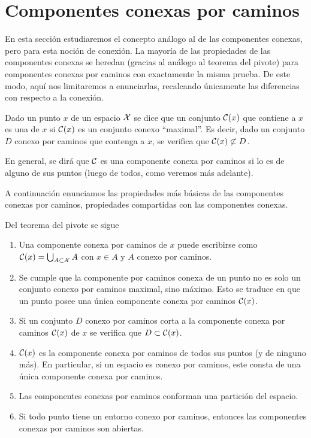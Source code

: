 \section{Componentes conexas por caminos}
En esta sección estudiaremos el concepto análogo al de las componentes conexas, pero para esta noción de conexión. La mayoría de las propiedades de las componentes conexas se heredan (gracias al análogo al teorema del pivote) para componentes conexas por caminos con exactamente la misma prueba. De este modo, aquí nos limitaremos a enunciarlas, recalcando únicamente las diferencias con respecto a la conexión.
\begin{defi}
	Dado un punto $x$ de un espacio $\mathcal{X}$ se dice que un conjunto $\mathcal{C}(x)$ que contiene a $x$ es una  de $x$ si $\mathcal{C}(x)$ es un conjunto conexo ``maximal''. Es decir, dado un conjunto $D$ conexo por caminos que contenga a $x$, se verifica que $\mathcal{C}(x)\not\subset D$.
	
	En general, se dirá que $\mathcal{C}$ es una componente conexa por caminos si lo es de alguno de sus puntos (luego de todos, como veremos más adelante).
\end{defi}
A continuación enunciamos las propiedades más básicas de las componentes conexas por caminos, propiedades compartidas con las componentes conexas.
\begin{obs}Del teorema del pivote se sigue
	\begin{enumerate}
		\item Una componente conexa por caminos de $x$ puede escribirse como $\mathcal{C}(x)=\bigcup_{A\subset\mathcal{X}}A$ con $x\in A$ y $A$ conexo por caminos.
		\item Se cumple que la componente por caminos conexa de un punto no es solo un conjunto conexo por caminos maximal, sino máximo. Esto se traduce en que un punto posee una única componente conexa por caminos $\mathcal{C}(x)$.
		\item Si un conjunto $D$ conexo por caminos corta a la componente conexa por caminos $\mathcal{C}(x)$ de $x$ se verifica que $D\subset \mathcal{C}(x)$.
		\item $\mathcal{C}(x)$ es la componente conexa por caminos de todos sus puntos (y de ninguno más). En particular, si un espacio es conexo por caminos, este consta de una única componente conexa por caminos.
		\item Las componentes conexas por caminos conforman una partición del espacio.
		\item Si todo punto tiene un entorno conexo por caminos, entonces las componentes conexas por caminos son abiertas.\qedhere
	\end{enumerate}
\end{obs}
